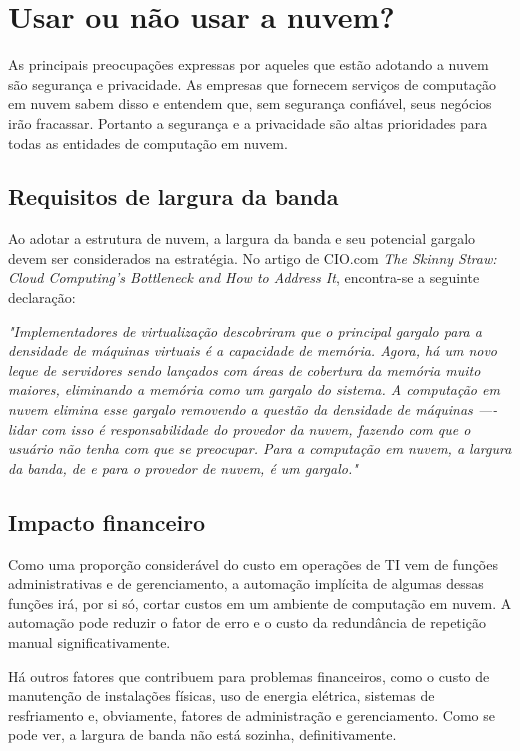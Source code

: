 \chapter{Usar ou não usar a nuvem?}

As principais preocupações expressas por aqueles que estão adotando a nuvem são
segurança e privacidade. As empresas que fornecem serviços de computação em nuvem
sabem disso e entendem que, sem segurança confiável, seus negócios irão
fracassar. Portanto a segurança e a privacidade são altas prioridades para todas as
entidades de computação em nuvem.


\section{Requisitos de largura da banda}

Ao adotar a estrutura de nuvem, a largura da banda e seu potencial gargalo devem ser
considerados na estratégia. No artigo de CIO.com \emph{The Skinny Straw: Cloud
Computing's Bottleneck and How to Address It}, encontra-se a seguinte declaração:

\begin{displayquote}
\emph{
    "Implementadores de virtualização descobriram que o principal gargalo para a 
    densidade de máquinas virtuais é a capacidade de memória. Agora, há um novo
    leque de servidores sendo lançados com áreas de cobertura da memória muito
    maiores, eliminando a memória como um gargalo do sistema. A computação em nuvem
    elimina esse gargalo removendo a questão da densidade de máquinas —- lidar com
    isso é responsabilidade do provedor da nuvem, fazendo com que o usuário não tenha
    com que se preocupar.
    Para a computação em nuvem, a largura da banda, de e para o provedor de nuvem,
    é um gargalo."
}
\end{displayquote}


\section{Impacto financeiro}

Como uma proporção considerável do custo em operações de TI vem de funções
administrativas e de gerenciamento, a automação implícita de algumas dessas
funções irá, por si só, cortar custos em um ambiente de computação em nuvem.
A automação pode reduzir o fator de erro e o custo da redundância de repetição
manual significativamente. 

Há outros fatores que contribuem para problemas financeiros, como o custo de
manutenção de instalações físicas, uso de energia elétrica, sistemas de
resfriamento e, obviamente, fatores de administração e gerenciamento. Como se
pode ver, a largura de banda não está sozinha, definitivamente.
